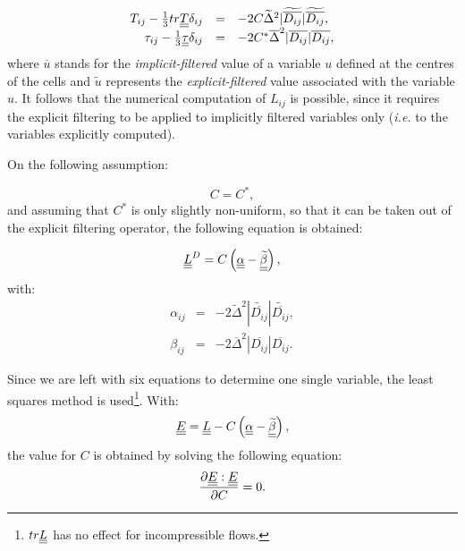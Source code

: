 \begin{equation}
\begin{array}{ r c l}
T_{ij}-\frac{1}{3}\trace \tens{T} \delta_{ij} &=& -2 C \widetilde{\Delta}^2 |\widetilde{%
\overline{D_{ij}}}| \widetilde{\overline{D_{ij}}}, \\
\tau_{ij}-\frac{1}{3} \tens{\tau } \delta_{ij} &=& -2 C^* \overline{\Delta}^2 |%
\overline{D_{ij}}| \overline{D_{ij}} ,
\end{array}
\end{equation}
where
$\overline{u}$ stands for the \emph{implicit-filtered} value of a variable $u$
defined at the centres of the cells and $\tilde{u}$ represents the
\emph{explicit-filtered} value associated with the variable $u$. It follows that
the numerical computation of $L_{ij}$ is possible, since it requires the
explicit filtering to be applied to implicitly filtered variables only
(\emph{i.e.} to the variables explicitly computed).

On the following assumption:

\begin{equation}
C = C^*,
\end{equation}
and assuming that $C^*$ is only slightly non-uniform, so that it can be
taken out of the explicit filtering operator, the following equation is
obtained:

\begin{equation}
\underline{\underline{L}}^D =  C \left(
\underline{\underline{ \alpha}}- \underline{\underline{\widetilde{\beta}}} \right),
\end{equation}
with:
\begin{equation}
\begin{array}{rcl}
\alpha_{ij} &=& -2 \widetilde{\Delta}^2 |\widetilde{\overline{D_{ij}}}|
\widetilde{\overline{D_{ij}}} , \\
\beta_{ij} &=& -2 \overline{\Delta}^2 |\overline{D_{ij}}| \overline{D_{ij}}.
\end{array}
\end{equation}

Since we are left with six equations to determine one single variable, the
least squares method is used\footnote{
$tr \underline{\underline{L}}$ has no effect for
incompressible flows.}. With:
\begin{equation}
\underline{\underline{E}} = \underline{\underline{L}}-C \left( \underline{\underline{\alpha}} - \underline{\underline{\widetilde{\beta}}} \right),
\end{equation}
the value for $C$ is obtained by solving the following equation:
\begin{equation}
\frac{\partial \underline{\underline{E}} : \underline{\underline{E}}}{\partial C} = 0.
\end{equation}

